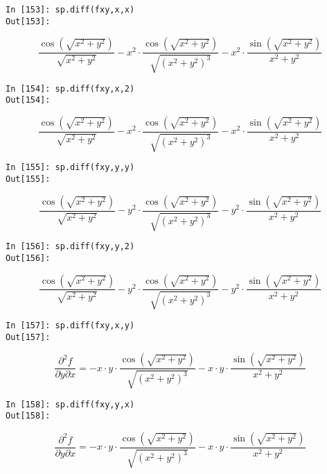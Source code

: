 \begin{center}
	\begin{minipage}{.6\textwidth}
		\begin{verbatim}
In [153]: sp.diff(fxy,x,x)
Out[153]: 	
		\end{verbatim}
		\begin{equation*}
			\frac{\cos(\sqrt{x^2+y^2})}{\sqrt{x^2+y^2}} - 
			x^2 \cdot \frac{\cos(\sqrt{x^2+y^2})}{\sqrt{(x^2+y^2)^3}} -
			x^2 \cdot \frac{\sin(\sqrt{x^2+y^2})}{x^2+y^2}
		\end{equation*}
		\begin{verbatim}
In [154]: sp.diff(fxy,x,2)
Out[154]:  
		\end{verbatim}
		\begin{equation*}
			\frac{\cos(\sqrt{x^2+y^2})}{\sqrt{x^2+y^2}} - 
			x^2 \cdot \frac{\cos(\sqrt{x^2+y^2})}{\sqrt{(x^2+y^2)^3}} -
			x^2 \cdot \frac{\sin(\sqrt{x^2+y^2})}{x^2+y^2}
		\end{equation*}
		\begin{verbatim}
In [155]: sp.diff(fxy,y,y)
Out[155]:   
		\end{verbatim}
		\begin{equation*} \frac{\cos(\sqrt{x^2+y^2})}{\sqrt{x^2+y^2}} - 
			y^2 \cdot \frac{\cos(\sqrt{x^2+y^2})}{\sqrt{(x^2+y^2)^3}} -
			y^2 \cdot \frac{\sin(\sqrt{x^2+y^2})}{x^2+y^2}
		\end{equation*}
		\begin{verbatim}
In [156]: sp.diff(fxy,y,2)
Out[156]:    
		\end{verbatim}
		\begin{equation*} \frac{\cos(\sqrt{x^2+y^2})}{\sqrt{x^2+y^2}} - 
			y^2 \cdot \frac{\cos(\sqrt{x^2+y^2})}{\sqrt{(x^2+y^2)^3}} -
			y^2 \cdot \frac{\sin(\sqrt{x^2+y^2})}{x^2+y^2}
		\end{equation*}
		\begin{verbatim}
In [157]: sp.diff(fxy,x,y)
Out[157]:
\end{verbatim}
\begin{equation*} 
	\frac{\partial^2f}{\partial y\partial x} =-x\cdot y\cdot\frac{\cos(\sqrt{x^2+y^2})}{\sqrt{(x^2+y^2)^3}} - 
	x\cdot y \cdot\frac{\sin(\sqrt{x^2+y^2})}{x^2+y^2} 
\end{equation*}
		\begin{verbatim}
In [158]: sp.diff(fxy,y,x)
Out[158]: 
\end{verbatim}
\begin{equation*} 
	\frac{\partial^2f}{\partial y\partial x} =-x\cdot y\cdot\frac{\cos(\sqrt{x^2+y^2})}{\sqrt{(x^2+y^2)^3}} - 
	x\cdot y \cdot\frac{\sin(\sqrt{x^2+y^2})}{x^2+y^2} 
\end{equation*}

	\end{minipage}
\end{center}
